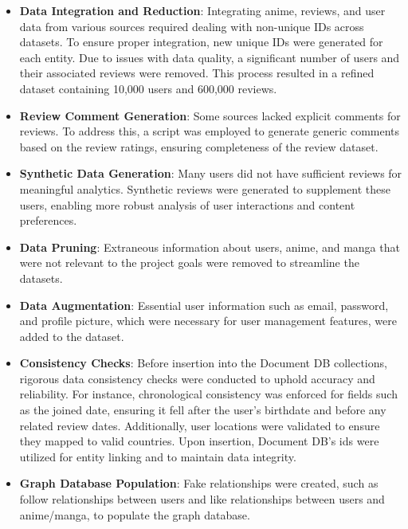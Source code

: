 \begin{itemize}
    \item \textbf{Data Integration and Reduction}: Integrating anime, reviews, and user data from various sources 
    required dealing with non-unique IDs across datasets. To ensure proper integration, 
    new unique IDs were generated for each entity. Due to issues with data quality, 
    a significant number of users and their associated reviews were removed. This process resulted in a 
    refined dataset containing 10,000 users and 600,000 reviews.
 
    \item \textbf{Review Comment Generation}: Some sources lacked explicit comments for reviews. To address this, 
    a script was employed to generate generic comments based on the review ratings, ensuring completeness of the review dataset.
    
    \item \textbf{Synthetic Data Generation}: Many users did not have sufficient reviews for meaningful analytics. 
    Synthetic reviews were generated to supplement these users, enabling more robust analysis 
    of user interactions and content preferences.
    
    \item \textbf{Data Pruning}: Extraneous information about users, anime, and manga that were 
    not relevant to the project goals were removed to streamline the datasets.
    
    \item \textbf{Data Augmentation}: Essential user information such as email, password, and profile picture, 
    which were necessary for user management features, were added to the dataset.
    
    \item \textbf{Consistency Checks}: Before insertion into the Document DB collections, rigorous data consistency checks were conducted to 
    uphold accuracy and reliability. For instance, chronological consistency was enforced for fields such as the joined date, 
    ensuring it fell after the user's birthdate and before any related review dates. Additionally, user locations were validated 
    to ensure they mapped to valid countries. Upon insertion, Document DB's ids were utilized for entity linking and to maintain data integrity.

    \item \textbf{Graph Database Population}: Fake relationships were created, such as follow relationships between users and like relationships 
    between users and anime/manga, to populate the graph database.
\end{itemize}

